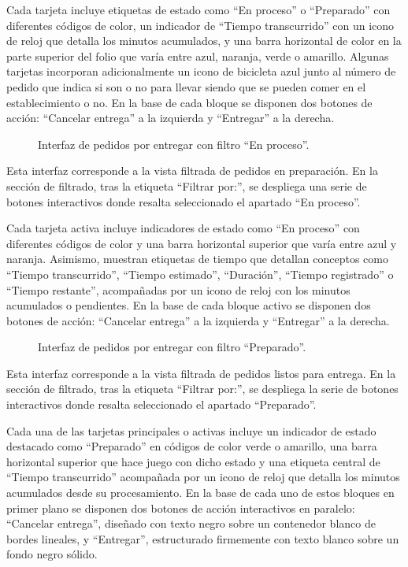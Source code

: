 Cada tarjeta incluye etiquetas de estado como ``En proceso'' o ``Preparado'' con diferentes códigos de color, un indicador de ``Tiempo transcurrido'' con un icono de reloj que detalla los minutos acumulados, y una barra horizontal de color en la parte superior del folio que varía entre azul, naranja, verde o amarillo. Algunas tarjetas incorporan adicionalmente un icono de bicicleta azul junto al número de pedido que indica si son o no para llevar siendo que se pueden comer en el establecimiento o no. En la base de cada bloque se disponen dos botones de acción: ``Cancelar entrega'' a la izquierda y ``Entregar'' a la derecha.

\begin{figure}[H]
    \centering
    
    \caption{Interfaz de pedidos por entregar con filtro ``En proceso''.}
    \label{fig:ui-ent-02-en-proceso}
\end{figure}

Esta interfaz corresponde a la vista filtrada de pedidos en preparación. En la sección de filtrado, tras la etiqueta ``Filtrar por:'', se despliega una serie de botones interactivos donde resalta seleccionado el apartado ``En proceso''. 

Cada tarjeta activa incluye indicadores de estado como ``En proceso'' con diferentes códigos de color y una barra horizontal superior que varía entre azul y naranja. Asimismo, muestran etiquetas de tiempo que detallan conceptos como ``Tiempo transcurrido'', ``Tiempo estimado'', ``Duración'', ``Tiempo registrado'' o ``Tiempo restante'', acompañadas por un icono de reloj con los minutos acumulados o pendientes. En la base de cada bloque activo se disponen dos botones de acción: ``Cancelar entrega'' a la izquierda y ``Entregar'' a la derecha.

\begin{figure}[H]
    \centering
    
    \caption{Interfaz de pedidos por entregar con filtro ``Preparado''.}
    \label{fig:ui-ent-02-preparados}
\end{figure}

Esta interfaz corresponde a la vista filtrada de pedidos listos para entrega. En la sección de filtrado, tras la etiqueta ``Filtrar por:'', se despliega la serie de botones interactivos donde resalta seleccionado el apartado ``Preparado''. 

Cada una de las tarjetas principales o activas incluye un indicador de estado destacado como ``Preparado'' en códigos de color verde o amarillo, una barra horizontal superior que hace juego con dicho estado y una etiqueta central de ``Tiempo transcurrido'' acompañada por un icono de reloj que detalla los minutos acumulados desde su procesamiento. En la base de cada uno de estos bloques en primer plano se disponen dos botones de acción interactivos en paralelo: ``Cancelar entrega'', diseñado con texto negro sobre un contenedor blanco de bordes lineales, y ``Entregar'', estructurado firmemente con texto blanco sobre un fondo negro sólido.

